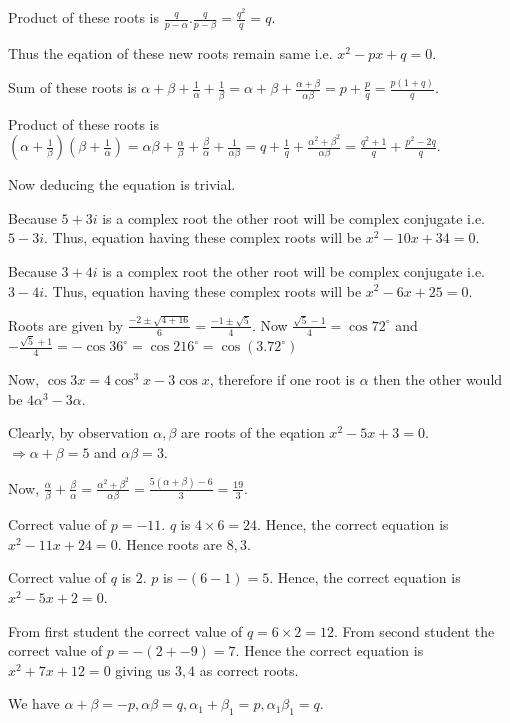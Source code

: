     Product of these roots is $\frac{q}{p - \alpha}.\frac{q}{p - \beta} = \frac{q^2}{q} = q$.

    Thus the eqation of these new roots remain same i.e. $x^2 - px + q = 0$.
  \item Sum of these roots is $\alpha + \beta + \frac{1}{\alpha} + \frac{1}{\beta} = \alpha + \beta +
    \frac{\alpha + \beta}{\alpha\beta} = p + \frac{p}{q} = \frac{p(1 + q)}{q}$.

    Product of these roots is $\left(\alpha + \frac{1}{\beta}\right)\left(\beta + \frac{1}{\alpha}\right) =
    \alpha\beta + \frac{\alpha}{\beta} + \frac{\beta}{\alpha} + \frac{1}{\alpha\beta} = q + \frac{1}{q} +
    \frac{\alpha^2 + \beta^2}{\alpha\beta} = \frac{q^2 + 1}{q} + \frac{p^2 - 2q}{q}$.

    Now deducing the equation is trivial.
  \stopitemize
\item Because $5 + 3i$ is a complex root the other root will be complex conjugate i.e. $5 - 3i$. Thus,
  equation having these complex roots will be $x^2 - 10x + 34 = 0$.
\item Because $3 + 4i$ is a complex root the other root will be complex conjugate i.e. $3 - 4i$. Thus,
  equation having these complex roots will be $x^2 - 6x + 25 = 0$.
\item Roots are given by $\frac{-2\pm\sqrt{4 + 16}}{6} = \frac{-1\pm\sqrt{5}}{4}$. Now $\frac{\sqrt{5} -
  1}{4} = \cos72^\circ$ and $-\frac{\sqrt{5} + 1}{4} = -\cos36^\circ = \cos216^\circ = \cos(3.72^\circ)$

  Now, $\cos3x = 4\cos^3x - 3\cos x$, therefore if one root is $\alpha$ then the other would be $4\alpha^3 -
  3\alpha$.
\item Clearly, by observation $\alpha, \beta$ are roots of the eqation $x^2 - 5x + 3 = 0$. $\Rightarrow
  \alpha + \beta = 5$ and $\alpha\beta = 3$.

  Now, $\frac{\alpha}{\beta} + \frac{\beta}{\alpha} = \frac{\alpha^2 + \beta^2}{\alpha\beta} =
  \frac{5(\alpha + \beta) - 6}{3} = \frac{19}{3}$.
\item Correct value of $p = -11$. $q$ is $4\times 6 = 24$. Hence, the correct equation is $x^2 - 11x + 24 =
  0$. Hence roots are $8, 3$.
\item Correct value of $q$ is $2$. $p$ is $-(6 - 1) = 5$. Hence, the correct equation is $x^2 - 5x + 2 = 0$.
\item From first student the correct value of $q = 6\times2 = 12$. From second student the correct value of
  $p = -(2 + -9) = 7$. Hence the correct equation is $x^2 + 7x + 12 = 0$ giving us $3, 4$ as correct roots.
\item We have $\alpha + \beta = -p, \alpha\beta = q, \alpha_1 + \beta_1 = p, \alpha_1\beta_1 = q$.

